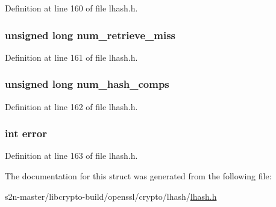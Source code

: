 Definition at line 160 of file lhash.\+h.

\subsubsection[{\texorpdfstring{num\+\_\+retrieve\+\_\+miss}{num_retrieve_miss}}]{\setlength{\rightskip}{0pt plus 5cm}unsigned long num\+\_\+retrieve\+\_\+miss}\hypertarget{structlhash__st_ac7d1ab0bf91b270a1fa430f056e85633}{}\label{structlhash__st_ac7d1ab0bf91b270a1fa430f056e85633}


Definition at line 161 of file lhash.\+h.

\subsubsection[{\texorpdfstring{num\+\_\+hash\+\_\+comps}{num_hash_comps}}]{\setlength{\rightskip}{0pt plus 5cm}unsigned long num\+\_\+hash\+\_\+comps}\hypertarget{structlhash__st_ae3be3adefb12e998ff113a1fadd19340}{}\label{structlhash__st_ae3be3adefb12e998ff113a1fadd19340}


Definition at line 162 of file lhash.\+h.

\subsubsection[{\texorpdfstring{error}{error}}]{\setlength{\rightskip}{0pt plus 5cm}int error}\hypertarget{structlhash__st_a11614f44ef4d939bdd984953346a7572}{}\label{structlhash__st_a11614f44ef4d939bdd984953346a7572}


Definition at line 163 of file lhash.\+h.



The documentation for this struct was generated from the following file\+:\begin{DoxyCompactItemize}
\item 
s2n-\/master/libcrypto-\/build/openssl/crypto/lhash/\hyperlink{crypto_2lhash_2lhash_8h}{lhash.\+h}\end{DoxyCompactItemize}
